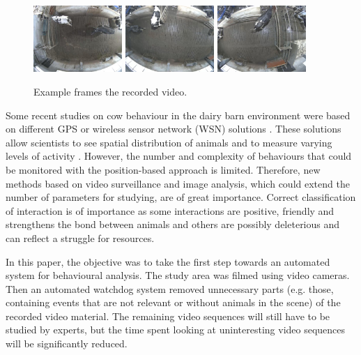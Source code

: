\documentclass{cta-author}
\begin{document}
\begin{figure}[b]
\begin{center}
  \includegraphics[width=0.3\textwidth]{old-2.jpg}
  \includegraphics[width=0.3\textwidth]{old-1.jpg}
  \includegraphics[width=0.3\textwidth]{old-0.jpg}
\end{center}
  \caption{Example frames the recorded video.}
  \label{fig:old}
\end{figure}


Some recent studies on cow behaviour in the dairy barn environment were based on different GPS or wireless sensor network (WSN) solutions \cite{Nadimietal2012}. These solutions allow scientists to see spatial distribution of animals and to measure varying levels of activity \cite{Nadimietal2012}. However, the number and complexity of behaviours that could be monitored with the position-based approach is limited. Therefore, new methods based on video surveillance and image analysis, which could extend the number of parameters for studying, are of great importance. Correct classification of interaction is of importance as some interactions are positive, friendly and strengthens the bond between animals and others are possibly deleterious and can reflect a struggle for resources.

In this paper, the objective was to take the first step towards an automated system for behavioural analysis. The study area was filmed using video cameras. Then an automated watchdog system removed unnecessary parts (e.g. those, containing events that are not relevant or without animals in the scene) of the recorded video material. The remaining video sequences will still have to be studied by experts, but the time spent looking at uninteresting video sequences will be significantly reduced. 
\end{document}
